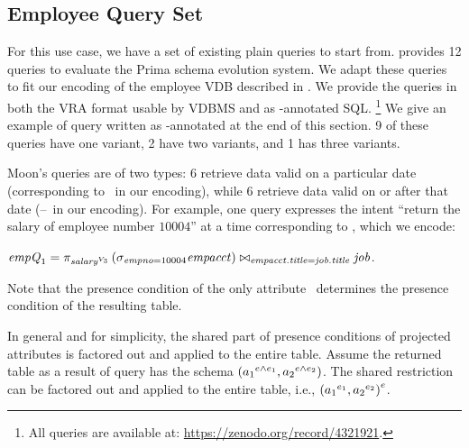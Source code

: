 \subsection{Employee Query Set}
\label{sec:emp-qs}




For this use case, we have a set of existing plain queries to start from.
\citet{prima08Moon} provides 12 queries to evaluate the Prima schema evolution
system. We adapt these queries to fit our encoding of the employee VDB
described in .
%
We provide the queries in both the VRA format usable by VDBMS and as
-annotated SQL.%
\footnote{All queries are available at: \url{https://zenodo.org/record/4321921}.}
%
We give an example of query written as -annotated at the end of this section.
%
9 of these queries have one variant, 2 have two variants, and 1 has three
variants. 


Moon's queries are of two types: 6 retrieve data valid on a particular date
(corresponding to \vThree\ in our encoding), while 6 retrieve data valid on or
after that date (\vThree--\vFive\ in our encoding).
%
For example, one query expresses the intent ``return the salary of employee
number $10004$'' at a time corresponding to \vThree, which we encode:
\centerline{
\ensuremath{
\eq_1 = \vPrj[\oatt{\salary}{\vThree}]{%
  \joinRelR{\selectRel{\empno=10004}{\empacct}}{\job}
           {\empacct.\titleatt = \job.\titleatt}}
}.}
 Note that the presence condition of the only attribute \salary\ determines the
 presence condition of the resulting table.

 In general and for simplicity, the shared part of presence conditions of
  projected attributes is factored out and applied to 
  the entire table. Assume the returned table as a result of
  query has the schema $\left(\oatt {\vAtt_1} {\dimMeta \wedge \dimMeta_1}, 
  \oatt {\vAtt_2} {\dimMeta \wedge \dimMeta_2} \right)$.
 The shared restriction can be factored out and applied
 to the entire table, i.e., $\left( \oatt {\vAtt_1} {\dimMeta_1},
 \oatt {\vAtt_2} {\dimMeta_2} \right)^\dimMeta$.
%

